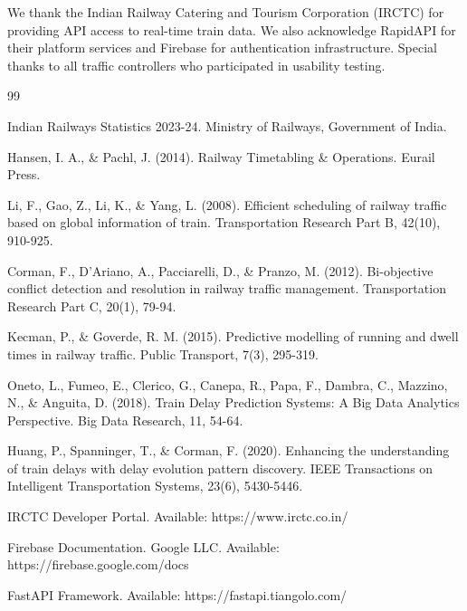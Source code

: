 \documentclass[12pt,a4paper]{article}
\begin{document}
We thank the Indian Railway Catering and Tourism Corporation (IRCTC) for providing API access to real-time train data. We also acknowledge RapidAPI for their platform services and Firebase for authentication infrastructure. Special thanks to all traffic controllers who participated in usability testing.

\begin{thebibliography}{99}

Indian Railways Statistics 2023-24. Ministry of Railways, Government of India.

Hansen, I. A., \& Pachl, J. (2014). Railway Timetabling \& Operations. Eurail Press.

Li, F., Gao, Z., Li, K., \& Yang, L. (2008). Efficient scheduling of railway traffic based on global information of train. Transportation Research Part B, 42(10), 910-925.

Corman, F., D'Ariano, A., Pacciarelli, D., \& Pranzo, M. (2012). Bi-objective conflict detection and resolution in railway traffic management. Transportation Research Part C, 20(1), 79-94.

Kecman, P., \& Goverde, R. M. (2015). Predictive modelling of running and dwell times in railway traffic. Public Transport, 7(3), 295-319.

Oneto, L., Fumeo, E., Clerico, G., Canepa, R., Papa, F., Dambra, C., Mazzino, N., \& Anguita, D. (2018). Train Delay Prediction Systems: A Big Data Analytics Perspective. Big Data Research, 11, 54-64.

Huang, P., Spanninger, T., \& Corman, F. (2020). Enhancing the understanding of train delays with delay evolution pattern discovery. IEEE Transactions on Intelligent Transportation Systems, 23(6), 5430-5446.

IRCTC Developer Portal. Available: https://www.irctc.co.in/

Firebase Documentation. Google LLC. Available: https://firebase.google.com/docs

FastAPI Framework. Available: https://fastapi.tiangolo.com/

\end{thebibliography}
\end{document}
